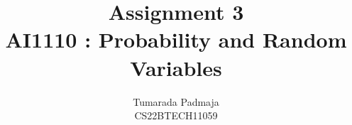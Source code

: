 \documentclass[journal,12pt,onecolumn]{IEEEtran}
\begin{document}
%


\newcommand{\BEQA}{\begin{eqnarray}}
\newcommand{\EEQA}{\end{eqnarray}}
\newcommand{\define}{\stackrel{\triangle}{=}}


%


\providecommand{\mbf}{\mathbf}
\providecommand{\pr}[1]{\ensuremath{\Pr\left(#1\right)}}
\providecommand{\qfunc}[1]{\ensuremath{Q\left(#1\right)}}
\providecommand{\sbrak}[1]{\ensuremath{{}\left[#1\right]}}
\providecommand{\lsbrak}[1]{\ensuremath{{}\left[#1\right.}}
\providecommand{\rsbrak}[1]{\ensuremath{{}\left.#1\right]}}
\providecommand{\brak}[1]{\ensuremath{\left(#1\right)}}
\providecommand{\lbrak}[1]{\ensuremath{\left(#1\right.}}
\providecommand{\rbrak}[1]{\ensuremath{\left.#1\right)}}
\providecommand{\cbrak}[1]{\ensuremath{\left\{#1\right\}}}
\providecommand{\lcbrak}[1]{\ensuremath{\left\{#1\right.}}
\providecommand{\rcbrak}[1]{\ensuremath{\left.#1\right\}}}
\theoremstyle{remark}
\newtheorem{rem}{Remark}
\newcommand{\sgn}{\mathop{\mathrm{sgn}}}
\providecommand{\abs}[1]{\left\vert#1\right\vert}
\providecommand{\res}[1]{\Res\displaylimits_{#1}} 
\providecommand{\norm}[1]{\left\lVert#1\right\rVert}
\providecommand{\mtx}[1]{\mathbf{#1}}
\providecommand{\mean}[1]{E\left[ #1 \right]}
\providecommand{\fourier}{\overset{\mathcal{F}}{ \rightleftharpoons}}
\providecommand{\system}{\overset{\mathcal{H}}{ \longleftrightarrow}}
\newcommand{\solution}{\noindent \textbf{Solution: }}
\newcommand{\cosec}{\,\text{cosec}\,}
\providecommand{\dec}[2]{\ensuremath{\overset{#1}{\underset{#2}{\gtrless}}}}
\newcommand{\myvec}[1]{\ensuremath{\begin{pmatrix}#1\end{pmatrix}}}
\newcommand{\mydet}[1]{\ensuremath{\begin{vmatrix}#1\end{vmatrix}}}

\let\vec\mathbf

\vspace{3cm}

\title{
Assignment 3\\AI1110 : Probability and Random Variables
}
\author{Tumarada Padmaja\\CS22BTECH11059}
\end{document}
